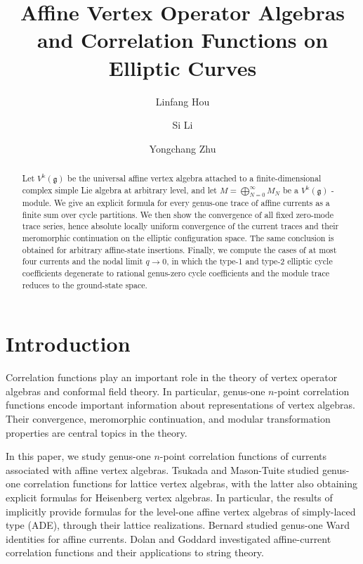 \documentclass[11pt,a4paper]{amsart}
\title[Affine Current Traces on the Torus]{
Affine Vertex Operator Algebras and Correlation Functions on Elliptic Curves}
\author{Linfang Hou}
\author{Si Li}
\author{Yongchang Zhu}
\date{}
\numberwithin{equation}{section}
\theoremstyle{definition}
\theoremstyle{remark}
\newcommand{\g}{\mathfrak g}
\newcommand{\kk}{\Bbbk}
\begin{document}
\begin{abstract}
Let $V^{\kk}(\g)$ be the universal affine vertex algebra attached to a finite-dimensional complex simple Lie algebra at arbitrary level, and let $M=\bigoplus_{N=0}^{\infty}M_N$ be a $V^{\kk}(\g)$ -module.  We give an explicit formula for every genus-one trace of affine currents as a finite sum over cycle partitions.  We then show  the convergence of all fixed zero-mode trace series, hence absolute locally uniform convergence of the current traces and their meromorphic continuation on the elliptic configuration space.  The same conclusion is obtained for arbitrary affine-state insertions.  Finally, we compute the cases of at most four currents and the nodal limit $q\to 0$, in which the type-1 and type-2 elliptic cycle coefficients degenerate to rational genus-zero cycle coefficients and the module trace reduces to the ground-state space.
\end{abstract}
\maketitle

\tableofcontents

\section{Introduction}


Correlation functions play an important role in the theory of vertex operator algebras and conformal field theory.  In particular, genus-one $n$-point correlation functions encode important information about representations of vertex algebras. Their convergence, meromorphic continuation, and modular transformation properties are central topics in the theory.

In this paper, we study genus-one $n$-point correlation functions of currents associated with affine vertex algebras. Tsukada \cite{T} and Mason-Tuite \cite{MT} studied genus-one correlation functions for lattice vertex algebras, with the latter also obtaining explicit formulas for Heisenberg vertex algebras. In particular, the results of \cite{MT} implicitly provide formulas for the level-one affine vertex algebras of simply-laced type (ADE), through their lattice realizations. Bernard \cite{B} studied genus-one Ward identities for affine currents.  Dolan and Goddard \cite{DG07,DolanGoddard} investigated affine-current correlation functions and their applications to string theory.
\end{document}
